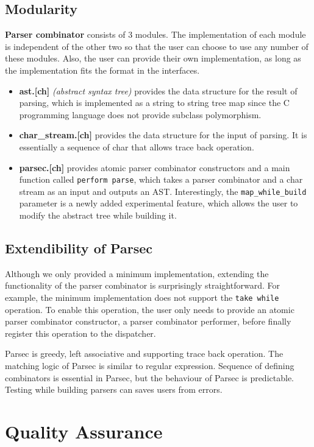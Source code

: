 \documentclass{article}
\begin{document}
\subsection{Modularity}
\textbf{Parser combinator} consists of 3 modules.
The implementation of each module is independent of the other two so that the user can choose to use any number of these modules.
Also, the user can provide their own implementation, as long as the implementation fits the format in the interfaces.
\begin{itemize}
    \item \textbf{ast.[ch]} \textit{(abstract syntax tree)} provides the data structure for the result of parsing, which is implemented as a string to string tree map since the C programming language does not provide subclass polymorphism.
    \item \textbf{char\_stream.[ch]} provides the data structure for the input of parsing. It is essentially a sequence of char that allows trace back operation.
    \item \textbf{parsec.[ch]} provides atomic parser combinator constructors and a main function called \texttt{perform parse}, which takes a parser combinator and a char stream as an input and outputs an AST. Interestingly, the \texttt{map\_while\_build} parameter is a newly added experimental feature, which allows the user to modify the abstract tree while building it.
\end{itemize}

\subsection{Extendibility of Parsec}
Although we only provided a minimum implementation, extending the functionality of the parser combinator is surprisingly straightforward. For example, the minimum implementation does not support the \texttt{take while} operation. To enable this operation, the user only needs to provide an atomic parser combinator constructor, a parser combinator performer, before finally register this operation to the dispatcher.

Parsec is greedy, left associative and supporting trace back operation. The matching logic of Parsec is similar to regular expression. Sequence of defining combinators is essential in Parsec, but the behaviour of Parsec is predictable. Testing while building parsers can saves users from errors.

\section{Quality Assurance}
\end{document}
